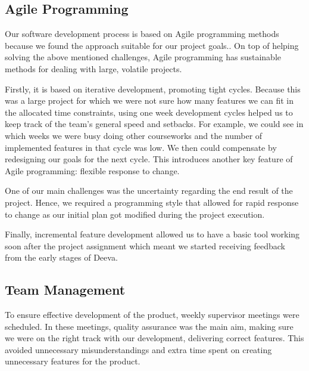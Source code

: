 \documentclass[11pt, a4paper]{article}
\begin{document}
\subsection{Agile Programming}

Our software development process is based on Agile programming methods because we found the approach suitable for our project goals..
On top of helping solving the above mentioned challenges, Agile programming has sustainable methods for dealing with large, volatile projects.

Firstly, it is based on iterative development, promoting tight cycles.
Because this was a large project for which we were not sure how many features we can fit in the allocated time constraints, using one week development cycles helped us to keep track of the team's general speed and setbacks.
For example, we could see in which weeks we were busy doing other courseworks and the number of implemented features in that cycle was low.
We then could compensate by redesigning our goals for the next cycle.
This introduces another key feature of Agile programming: flexible response to change.

One of our main challenges was the uncertainty regarding the end result of the project.
Hence, we required a programming style that allowed for rapid response to change as our initial plan got modified during the project execution.

Finally, incremental feature development allowed us to have a basic tool working soon after the project assignment which meant we started receiving feedback from the early stages of Deeva.

\subsection{Team Management}

To ensure effective development of the product, weekly supervisor meetings were scheduled.
In these meetings, quality assurance was the main aim, making sure we were on the right track with our development, delivering correct features.
This avoided unnecessary misunderstandings and extra time spent on creating unnecessary features for the product.
\end{document}
